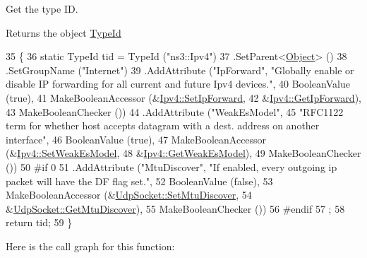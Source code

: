Get the type ID. 

\begin{DoxyReturn}{Returns}
the object \hyperlink{classns3_1_1TypeId}{Type\+Id} 
\end{DoxyReturn}

\begin{DoxyCode}
35 \{
36   \textcolor{keyword}{static} TypeId tid = TypeId (\textcolor{stringliteral}{"ns3::Ipv4"})
37     .SetParent<\hyperlink{classns3_1_1Object_a40860402e64d8008fb42329df7097cdb}{Object}> ()
38     .SetGroupName (\textcolor{stringliteral}{"Internet"})
39     .AddAttribute (\textcolor{stringliteral}{"IpForward"}, \textcolor{stringliteral}{"Globally enable or disable IP forwarding for all current and future Ipv4
       devices."},
40                    BooleanValue (\textcolor{keyword}{true}),
41                    MakeBooleanAccessor (&\hyperlink{classns3_1_1Ipv4_a12decc8332283f56ba59b0aacb3498ca}{Ipv4::SetIpForward},
42                                         &\hyperlink{classns3_1_1Ipv4_ac6803a68ed412d4aae3108afc2afd890}{Ipv4::GetIpForward}),
43                    MakeBooleanChecker ())
44     .AddAttribute (\textcolor{stringliteral}{"WeakEsModel"}, 
45                    \textcolor{stringliteral}{"RFC1122 term for whether host accepts datagram with a dest. address on another
       interface"},
46                    BooleanValue (\textcolor{keyword}{true}),
47                    MakeBooleanAccessor (&\hyperlink{classns3_1_1Ipv4_a3bdaf12fbfaca276c1a60a3a7cd9b68c}{Ipv4::SetWeakEsModel},
48                                         &\hyperlink{classns3_1_1Ipv4_a3d9882e80ef4e0e2375d89037f3ab5e1}{Ipv4::GetWeakEsModel}),
49                    MakeBooleanChecker ())
50 \textcolor{preprocessor}{#if 0}
51     .AddAttribute (\textcolor{stringliteral}{"MtuDiscover"}, \textcolor{stringliteral}{"If enabled, every outgoing ip packet will have the DF flag set."},
52                    BooleanValue (\textcolor{keyword}{false}),
53                    MakeBooleanAccessor (&\hyperlink{classns3_1_1UdpSocket_ae3f06fb2459a7c09f91068905a063a6a}{UdpSocket::SetMtuDiscover},
54                                         &\hyperlink{classns3_1_1UdpSocket_abd9c668464d5f89f17780fcd932777c2}{UdpSocket::GetMtuDiscover}),
55                    MakeBooleanChecker ())
56 \textcolor{preprocessor}{#endif}
57   ;
58   \textcolor{keywordflow}{return} tid;
59 \}
\end{DoxyCode}


Here is the call graph for this function\+:


